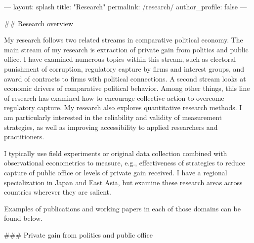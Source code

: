 ---
layout: splash
title: "Research"
permalink: /research/
author_profile: false
---

## Research overview

My research follows two related streams in comparative political economy. The main stream of my research is extraction of private gain from politics and public office. I have examined numerous topics within this stream, such as electoral punishment of corruption, regulatory capture by firms and interest groups, and award of contracts to firms with political connections. A second stream looks at economic drivers of comparative political behavior. Among other things, this line of research has examined how to encourage collective action to overcome regulatory capture. My research also explores quantitative research methods. I am particularly interested in the reliability and validity of measurement strategies, as well as improving accessibility to applied researchers and practitioners. 

I typically use field experiments or original data collection combined with observational econometrics to measure, e.g., effectiveness of strategies to reduce capture of public office or levels of private gain received. I have a regional specialization in Japan and East Asia, but examine these research areas across countries wherever they are salient.

Examples of publications and working papers in each of those domains can be found below. 

### Private gain from politics and public office

